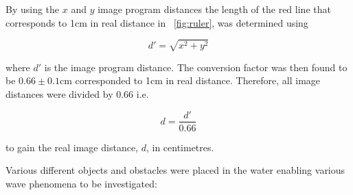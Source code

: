 \documentclass{article}
\newcommand{\figref}[2][\figurename~]{#1\ref{#2}}
\begin{document}
\vspace{2mm}
\noindent
By using the $x$ and $y$ image program distances the length of the red line that corresponds to 1cm in real distance in \figref{fig:ruler}, was determined using 

\vspace{2mm}
\noindent
\begin{equation}
\label{eq:pythagoras}
d' = \sqrt{x^2 + y^2}
\end{equation}

\vspace{2mm}
\noindent
where $d'$ is the image program distance. The conversion factor was then found to be $0.66 \pm 0.1$cm corresponded to 1cm in real distance. Therefore, all image distances were divided by 0.66 i.e. 

\vspace{2mm}
\noindent
\begin{equation}
\label{eq:conversion}
d = \frac{d'}{0.66}
\end{equation}

\vspace{2mm}
\noindent
to gain the real image distance, $d$, in centimetres.

\vspace{2mm}
\noindent
Various different objects and obstacles were placed in the water enabling various wave phenomena to be investigated:
\end{document}
